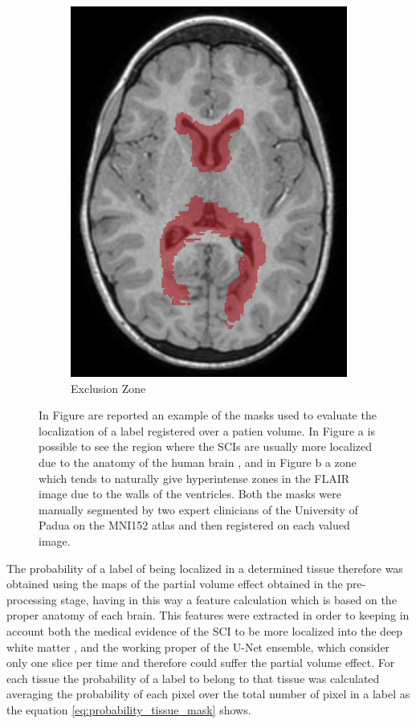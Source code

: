 \documentclass{standalone}
\begin{document}
\begin{figure}[h!]
\begin{subfigure}[b]{0.49\textwidth}
             \includegraphics[scale=0.18]{img/Chap2/exclude.jpg}
             \caption{Exclusion Zone}\label{fig:exclusion}
        \end{subfigure}
        \caption{In Figure are reported an example of the masks used to evaluate the localization of a label registered over a patien volume. In Figure a is possible to see the region where the SCIs are usually more localized due to the anatomy of the human brain \cite{ART:Howing}, and in Figure b a zone which tends to naturally give hyperintense zones in the FLAIR image due to the walls of the ventricles. Both the masks were manually segmented by two expert clinicians of the University of Padua on the MNI152 atlas \cite{MNI152_09a} and then registered on each valued image.}\label{fig:masks}
\end{figure}


The probability of a label of being localized in a determined tissue therefore was obtained using the maps of the partial volume effect obtained in the pre-processing stage, having in this way a feature calculation which is based on the proper anatomy of each brain. This features were extracted in order to keeping in account both the medical evidence of the SCI to be more localized into the deep white matter \cite{ART:Howing}, and the working proper of the U-Net ensemble, which consider only one slice per time and therefore could suffer the partial volume effect.
For each tissue the probability of a label to belong to that tissue was calculated averaging the probability of each pixel over the total number of pixel in a label as the equation \ref{eq:probability_tissue_mask} shows.
\end{document}
